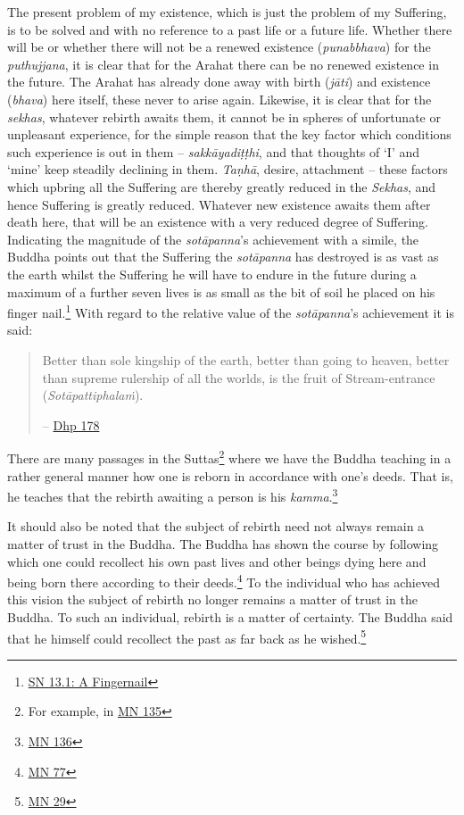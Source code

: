 The present problem of my existence, which is just the problem of my  Suffering, is to be solved  and  with no reference to a past life or a future life. Whether there will be or whether there will not be a renewed existence (\emph{punabbhava}) for the \emph{puthujjana}, it is clear that for the Arahat there can be no renewed existence in the future. The Arahat has already done away with birth (\emph{jāti}) and existence (\emph{bhava}) here itself, these never to arise again. Likewise, it is clear that for the \emph{sekhas}, whatever rebirth awaits them, it cannot be in spheres of unfortunate or unpleasant experience, for the simple reason that the key factor which conditions such experience is out in them -- \emph{sakkāyadiṭṭhi}, and that thoughts of `I' and `mine' keep steadily declining in them. \emph{Taṇhā}, desire, attachment -- these factors which upbring all the Suffering are thereby greatly reduced in the \emph{Sekhas}, and hence Suffering is greatly reduced. Whatever new existence awaits them after death here, that will be an existence with a very reduced degree of Suffering. Indicating the magnitude of the \emph{sotāpanna}'s achievement with a simile, the Buddha points out that the Suffering the \emph{sotāpanna} has destroyed is as vast as the earth whilst the Suffering he will have to endure in the future during a maximum of a further seven lives is as small as the bit of soil he placed on his finger nail.\footnote{\href{https://suttacentral.net/sn13.1/en/sujato}{SN 13.1: A Fingernail}} With regard to the relative value of the \emph{sotāpanna}'s achievement it is said:

\begin{quote}
Better than sole kingship of the earth, better than going to heaven, better than supreme rulership of all the worlds, is the fruit of Stream-entrance (\emph{Sotāpattiphalaṁ}).

 -- \href{https://suttacentral.net/dhp167-178/en/sujato}{Dhp 178}
\end{quote}

There are many passages in the Suttas\footnote{For example, in \href{https://suttacentral.net/mn135/en/bodhi}{MN 135}} where we have the Buddha teaching in a rather general manner how one is reborn in accordance with one's deeds. That is, he teaches that the rebirth awaiting a person is  his \emph{kamma}.\footnote{\href{https://suttacentral.net/mn136/en/thanissaro}{MN 136}}

It should also be noted that the subject of rebirth need not always remain a matter of trust in the Buddha. The Buddha has shown the course by following which one could recollect his own past lives and  other beings dying here and being born there according to their deeds.\footnote{\href{https://suttacentral.net/mn77/en/bodhi}{MN 77}} To the individual who has achieved this vision the subject of rebirth no longer remains a matter of trust in the Buddha. To such an individual, rebirth is a matter of certainty. The Buddha said that he himself could recollect the past as far back as he wished.\footnote{\href{https://suttacentral.net/mn29/en/bodhi}{MN 29}}

